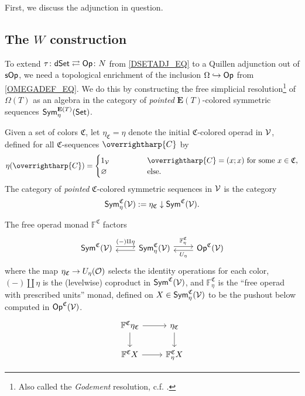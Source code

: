 \documentclass[a4paper,10pt
,draft
]{article}%
\renewcommand{\1}{\eta}%
\newcommand{\vect}[1]{\text{\overrightharp{\ensuremath{#1}}}}
\begin{document}
First, we discuss the adjunction in question.

\subsection{The $W$ construction}

To extend $\tau \colon \mathsf{dSet} \rightleftarrows \mathsf{Op} \colon N$ from \eqref{DSETADJ_EQ} to a Quillen adjunction out of $\mathsf{sOp}$,
we need a topological enrichment of the inclusion $\Omega \hookrightarrow \mathsf{Op}$ from \eqref{OMEGADEF_EQ}.
We do this by constructing the free simplicial resolution\footnote{Also called the \textit{Godement} resolution, c.f. \cite[\S 8.3]{BM06}.}
of $\Omega(T)$ as an algebra in the category of \textit{pointed} $\mathbf E(T)$-colored symmetric sequences $\mathsf{Sym}^{\mathbf E(T)}_{\eta}(\mathsf{Set})$.

\begin{definition}
      Given a set of colors $\mathfrak C$, let $\eta_{\mathfrak C} = \eta$ denote the initial $\mathfrak C$-colored operad in $\mathcal V$,
      defined for all $\mathfrak C$-sequences $\vect C$ by
      \[
            \eta(\vect C) =
            \begin{cases}
                  1_\V \qquad \qquad & \vect C = (x;x) \mbox{ for some $x \in \mathfrak C$,}
                  \\
                  \varnothing & \mbox{else.}
            \end{cases}
      \]
      The category of \textit{pointed} $\mathfrak C$-colored symmetric sequences in $\mathcal V$ is the category
      \[
            \mathsf{Sym}^{\mathfrak C}_\eta(\mathcal V) := \eta_{\mathfrak C} \downarrow \mathsf{Sym}^{\mathfrak C}(\mathcal V).
      \]
\end{definition}

The free operad monad $\mathbb F^{\mathfrak C}$ factors
\begin{equation}
      \label{FC_FAC_EQ}
      \begin{tikzcd}
            \Sym^{\mathfrak C}(\V) \arrow[r, shift left, "{(-) \amalg \eta}"]
            &
            \Sym^{\mathfrak C}_\eta(\V) \arrow[l, shift left] \arrow[r, shift left, "\mathbb F^{\mathfrak C}_\eta"]
            &
            \Op^{\mathfrak C}(\V) \arrow[l, shift left, "U_\eta"]
      \end{tikzcd}
\end{equation}
where the map $\eta_{\mathfrak C} \to U_\eta(\mathcal{O})$ selects the identity operations for each color,
$(-) \amalg \eta$ is the (levelwise) coproduct in $\mathsf{Sym}^{\mathfrak C}(\mathcal V)$,
and $\mathbb F^{\mathfrak C}_\eta$ is the ``free operad with prescribed units'' monad,
defined on $X \in \mathsf{Sym}^{\mathfrak C}_\eta(\mathcal V)$ to be the pushout below computed in $\mathsf{Op}^{\mathfrak C}(\mathcal V)$.
\begin{equation}
      \label{FETA_EQ}
      \begin{tikzcd}
            \mathbb F^{\mathfrak C} \eta_{\mathfrak C} \arrow[d] \arrow[r]
            &
            \eta_{\mathfrak C} \arrow[d]
            \\
            \mathbb F^{\mathfrak C} X \arrow[r]
            &
            \mathbb F^{\mathfrak C}_\eta X
      \end{tikzcd}
\end{equation}
\end{document}
